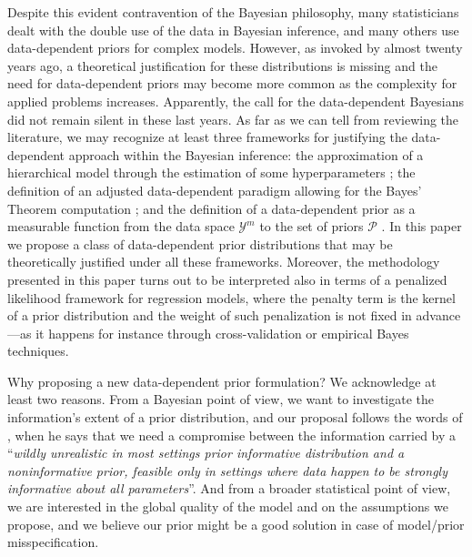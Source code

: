 \documentclass{statsoc}
\begin{document}
Despite this evident contravention of the Bayesian philosophy, many statisticians dealt with the double use of the data in Bayesian inference, and many others use data-dependent priors for complex models. However, as invoked by \cite{wasserman2000asymptotic} almost twenty years ago, a theoretical justification for these distributions is missing and the need for data-dependent priors may become more common as the complexity for applied problems increases. Apparently, the call for the data-dependent Bayesians did not remain silent in these last years. As far as we can tell from reviewing the literature, we may recognize at least three frameworks for justifying the data-dependent approach within the Bayesian inference: the approximation of a hierarchical model through the estimation of some hyperparameters \citep{gelmandatadependent}; the definition of an adjusted data-dependent paradigm allowing for the Bayes' Theorem computation \citep{darnieder2011bayesian}; and the definition of a data-dependent prior as a measurable function from the data space $\mathcal{Y}^{m}$ to the set of priors $\mathcal{P}$ \citep{wasserman2000asymptotic}. In this paper we propose a class of data-dependent prior distributions that may be theoretically justified under all these frameworks. Moreover, the methodology presented in this paper turns out to be interpreted also in terms of a penalized likelihood framework \citep{cole2013maximum} for regression models, where the penalty term is the kernel of a prior distribution and the weight of such penalization is not fixed in advance ---as it happens for instance through cross-validation or empirical Bayes techniques.

Why proposing a new data-dependent prior formulation? We acknowledge at least two reasons. From a Bayesian point of view, we want to investigate the information's extent of a prior distribution, and our proposal follows the words of \cite{gelmanpriors}, when he says that we need a compromise between the information carried by a ``\textit{wildly unrealistic in most settings prior informative distribution and a noninformative prior, feasible only in settings where data happen to be strongly informative about all parameters}''. And from a broader statistical point of view, we are interested in the global quality of the model and on the assumptions we propose, and we believe our prior might be a good solution in case of model/prior misspecification.
\end{document}
